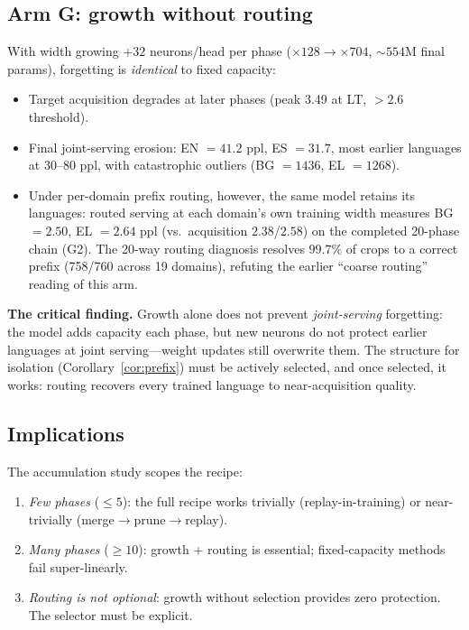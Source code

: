\documentclass[11pt]{article}
\theoremstyle{definition}\newtheorem{definition}{Definition}
\theoremstyle{remark}\newtheorem{remark}{Remark}
\begin{document}
\subsection{Arm G: growth without routing}

With width growing $+32$ neurons/head per phase ($\times128{\to}\times704$, ${\sim}554$M final
params), forgetting is \emph{identical} to fixed capacity:
\begin{itemize}\itemsep2pt
\item Target acquisition degrades at later phases (peak 3.49 at LT, $>2.6$ threshold).
\item Final joint-serving erosion: EN $=41.2$ ppl, ES $=31.7$, most earlier languages at 30--80 ppl,
with catastrophic outliers (BG $=1436$, EL $=1268$).
\item Under per-domain prefix routing, however, the same model retains its languages:
routed serving at each domain's own training width measures BG $=2.50$, EL $=2.64$
ppl (vs.\ acquisition $2.38$/$2.58$) on the completed 20-phase chain (G2). The 20-way
routing diagnosis resolves $99.7\%$ of crops to a correct prefix (758/760 across 19
domains), refuting the earlier ``coarse routing'' reading of this arm.
\end{itemize}

\textbf{The critical finding.} Growth alone does not prevent \emph{joint-serving} forgetting:
the model adds capacity each phase, but new neurons do not protect earlier languages at
joint serving---weight updates still overwrite them. The structure for isolation
(Corollary~\ref{cor:prefix}) must be actively selected, and once selected, it works:
routing recovers every trained language to near-acquisition quality.

\subsection{Implications}

The accumulation study scopes the recipe:
\begin{enumerate}\itemsep2pt
\item \emph{Few phases} (${\le}5$): the full recipe works trivially (replay-in-training)
or near-trivially (merge$\to$prune$\to$replay).
\item \emph{Many phases} (${\ge}10$): growth + routing is essential; fixed-capacity methods
fail super-linearly.
\item \emph{Routing is not optional}: growth without selection provides zero protection.
The selector must be explicit.
\end{enumerate}
\end{document}
